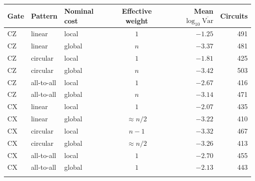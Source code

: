 \begin{tabular}{lllcrr}
\toprule
Gate & Pattern & Nominal cost & Effective weight & Mean $\log_{10}\overline{\mathrm{Var}}$ & Circuits \\
\midrule
CZ & linear & local & $1$ & $-1.25$ & 491 \\
CZ & linear & global & $n$ & $-3.37$ & 481 \\
CZ & circular & local & $1$ & $-1.81$ & 425 \\
CZ & circular & global & $n$ & $-3.42$ & 503 \\
CZ & all-to-all & local & $1$ & $-2.67$ & 416 \\
CZ & all-to-all & global & $n$ & $-3.14$ & 471 \\
\midrule
CX & linear & local & $1$ & $-2.07$ & 435 \\
CX & linear & global & $\approx n/2$ & $-3.22$ & 410 \\
CX & circular & local & $n-1$ & $-3.32$ & 467 \\
CX & circular & global & $\approx n/2$ & $-3.26$ & 413 \\
CX & all-to-all & local & $1$ & $-2.70$ & 455 \\
CX & all-to-all & global & $1$ & $-2.13$ & 443 \\
\botrule
\end{tabular}
